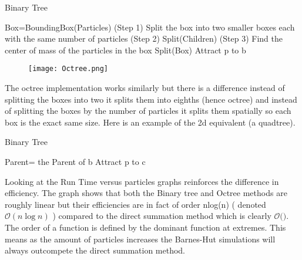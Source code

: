 \documentclass[11pt]{article}
\begin{document}
\begin{algorithm}
    \caption{Binary Tree} 
	\begin{algorithmic}[1]
	\State Box=BoundingBox(Particles) (Step 1)
	\State Split the box into two smaller boxes each with the same number of particles (Step 2)
	\State Split(Children) (Step 3)
	\State Find the center of mass of the particles in the box 
	\EndFunction
	\State Split(Box)
		        \State Attract p to b
		    \EndIf
			\EndFor
		\EndFor
	\end{algorithmic} 
\end{algorithm}
\vspace{40mm} %

\begin{figure}[h]
\begin{center}
\texttt{[image: Octree.png]}
\end{center}
\caption{
}
\label{setup}
\end{figure}

The octree implementation works similarly but there is a difference instead of splitting the boxes into two it splits them into eighths (hence octree) and instead of splitting the boxes by the number of particles it splits them spatially so each box is the exact same size. 
Here is an example of the 2d equivalent (a quadtree).

\begin{algorithm}
    \caption{Binary Tree} 
	\begin{algorithmic}[1]
			Parent= the Parent of b
		        \State Attract p to c
		    \EndIf
			\EndFor
			\EndFor
		\EndFor
	\end{algorithmic} 
\end{algorithm}
\vspace{50mm} %


Looking at the Run Time versus particles graphs reinforces the difference in efficiency. The graph shows that both the Binary tree and Octree methods are roughly linear but their efficiencies are in fact of order nlog(n) ( denoted $\mathcal{O}(n\log{}n)$ ) compared to the direct summation method which is clearly $\mathcal{O}($$)$. The order of a function is defined by the dominant function at extremes. This means as the amount of particles increases the Barnes-Hut simulations will always outcompete the direct summation method.
\end{document}
